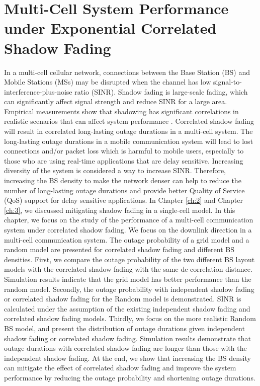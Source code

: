 \chapter{Multi-Cell System Performance under Exponential Correlated Shadow Fading}\label{ch:4}
 \par In a multi-cell cellular network, connections between the Base Station (BS) and Mobile Stations (MSs) may be disrupted when the channel has low signal-to-interference-plus-noise ratio (SINR). Shadow fading is large-scale fading, which can significantly affect signal strength and reduce SINR for a large area. Empirical measurements show that shadowing has significant correlations in realistic scenarios that can affect system performance \cite{graziano1978propagation}. Correlated shadow fading will result in correlated long-lasting outage durations in a multi-cell system. The long-lasting outage durations in a mobile communication system will lead to lost connections and/or packet loss which is harmful to mobile users, especially to those who are using real-time applications that are delay sensitive. Increasing diversity of the system is considered a way to increase SINR. Therefore, increasing the BS density to make the network denser can help to reduce the number of long-lasting outage durations and provide better Quality of Service (QoS) support for delay sensitive applications. In Chapter \ref{ch:2} and Chapter \ref{ch:3}, we discussed mitigating shadow fading in a single-cell model. In this chapter, we focus on the study of the performance of a multi-cell communication system under correlated shadow fading. We focus on the downlink direction in a multi-cell communication system. The outage probability of a grid model and a random model are presented for correlated shadow fading and different BS densities. First, we compare the outage probability of the two different BS layout models with the correlated shadow fading with the same de-correlation distance. Simulation results indicate that the grid model has better performance than the random model. Secondly, the outage probability with independent shadow fading or correlated shadow fading for the Random model is demonstrated. SINR is calculated under the assumption of the existing independent shadow fading and correlated shadow fading models. Thirdly, we focus on the more realistic Random BS model, and present the distribution of outage durations given independent shadow fading or correlated shadow fading. Simulation results demonstrate that outage durations with correlated shadow fading are longer than those with the independent shadow fading. At the end, we show that increasing the BS density can mitigate the effect of correlated shadow fading and improve the system performance by reducing the outage probability and shortening outage durations. 
 
